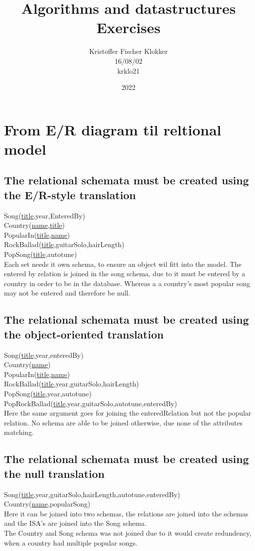 \documentclass[12pt, a4paper]{article}
\title{Algorithms and datastructures\\Exercises}
\date{2022}
\author{Kristoffer Fischer Klokker\\ 16/08/02\\ krklo21}
\begin{document}
	\maketitle
	\clearpage
	\tableofcontents
	\clearpage
	\section{From E/R diagram til reltional model}
		\subsection{The relational schemata must be created using the E/R-style translation}
			Song(\underline{title},year,EnteredBy)\\
			Country(\underline{name},\underline{title})\\
			PopularIn(\underline{title},\underline{name})\\
			RockBallad(\underline{title},guitarSolo,hairLength)\\
			PopSong(\underline{title},autotune)\\[4mm]
			Each set needs it own schema, to ensure an object wil fitt into the model. The entered by relation is joined in the song schema, due to it must be entered by a country in order to be in the database. Whereas a a country's most popular song may not be entered and therefore be null.
		\subsection{The relational schemata must be created using the object-oriented translation}
			Song(\underline{title},year,enteredBy)\\
			Country(\underline{name})\\
			PopularIn(\underline{title},\underline{name})\\
			RockBallad(\underline{title},year,guitarSolo,hairLength)\\
			PopSong(\underline{title},year,autotune)\\
			PopRockBallad(\underline{title},year,guitarSolo,autotune,enteredBy)\\[4mm]
			Here the same argument goes for joining the enteredRelation but not the popular relation. No schema are able to be joined otherwise, due none of the attributes matching.
		\subsection{The relational schemata must be created using the null translation}
			Song(\underline{title},year,guitarSolo,hairLength,autotune,enteredBy)\\
			Country(\underline{name},popularSong)\\[4mm]
			Here it can be joined into two schemas, the relations are joined into the schemas and the ISA's are joined into the Song schema.\\
			The Country and Song schema was not joined due to it would create redundency, when a country had multiple popular songs.
\end{document}
